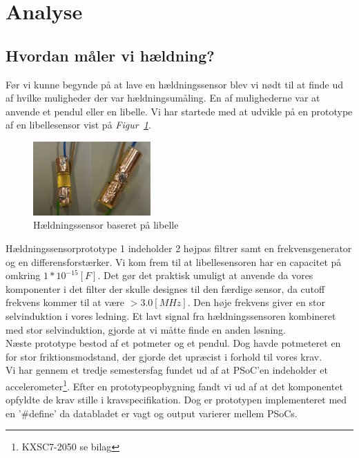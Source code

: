 \section{Analyse}
\subsection{Hvordan måler vi hældning?}
Før vi kunne begynde på at lave en hældningssensor blev vi nødt til at finde ud af hvilke muligheder der var hældningsumåling. En af mulighederne var at anvende et pendul eller en libelle. Vi har startede med at udvikle på en prototype af en libellesensor vist på \textit{Figur~\ref{fig:libelle}}.
\begin{figure}[hbpt]
\centering
\includegraphics[width=0.4\textwidth]{billeder/libellesensor1}
\caption{Hældningssensor baseret på libelle}
\label{fig:libelle}
\end{figure}
Hældningssensorprototype 1 indeholder 2 højpas filtrer samt en frekvensgenerator og en differensforstærker. Vi kom frem til at libellesensoren har en capacitet på omkring $1*10^{-15}[F]$. Det gør det praktisk umuligt at anvende da vores komponenter i det filter der skulle designes til den færdige sensor, da cutoff frekvens kommer til at være $>3.0[MHz]$. Den høje frekvens giver en stor selvinduktion i vores ledning. Et lavt signal fra hældningssensoren kombineret med stor selvinduktion, gjorde at vi måtte finde en anden løsning.\\
Næste prototype bestod af et potmeter og et pendul. Dog havde potmeteret en for stor friktionsmodstand, der gjorde det upræcist i forhold til vores krav.\\
Vi har gennem et tredje semestersfag fundet ud af at PSoC'en indeholder et accelerometer\footnote{KXSC7-2050 se bilag}. Efter en prototypeopbygning fandt vi ud af at det komponentet opfyldte de krav stille i kravspecifikation. Dog er prototypen implementeret med en '\#define' da databladet er vagt og output varierer mellem PSoCs.
